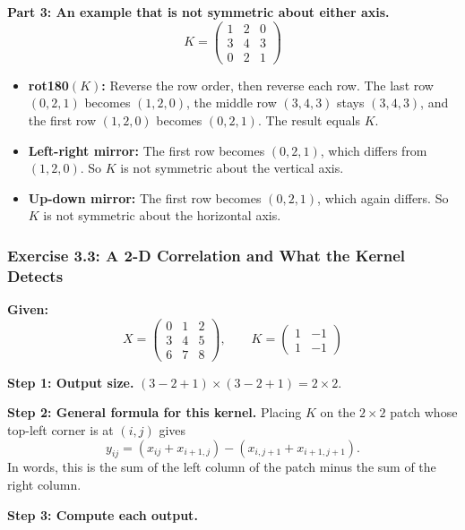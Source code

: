 \textbf{Part 3: An example that is not symmetric about either axis.}
\[
K = \begin{pmatrix} 1 & 2 & 0 \\ 3 & 4 & 3 \\ 0 & 2 & 1 \end{pmatrix}
\]
\begin{itemize}
  \item \textbf{rot180$(K)$:} Reverse the row order, then reverse each row. The last row $(0,2,1)$ becomes $(1,2,0)$, the middle row $(3,4,3)$ stays $(3,4,3)$, and the first row $(1,2,0)$ becomes $(0,2,1)$. The result equals $K$.
  \item \textbf{Left-right mirror:} The first row becomes $(0,2,1)$, which differs from $(1,2,0)$. So $K$ is not symmetric about the vertical axis.
  \item \textbf{Up-down mirror:} The first row becomes $(0,2,1)$, which again differs. So $K$ is not symmetric about the horizontal axis.
\end{itemize}

\subsubsection*{Exercise 3.3: A 2-D Correlation and What the Kernel Detects}

\textbf{Given:}
\[
X = \begin{pmatrix} 0 & 1 & 2 \\ 3 & 4 & 5 \\ 6 & 7 & 8 \end{pmatrix}, \qquad
K = \begin{pmatrix} 1 & -1 \\ 1 & -1 \end{pmatrix}
\]

\textbf{Step 1: Output size.}
$(3 - 2 + 1) \times (3 - 2 + 1) = 2 \times 2$.

\textbf{Step 2: General formula for this kernel.}
Placing $K$ on the $2\times 2$ patch whose top-left corner is at $(i, j)$ gives
\[
y_{ij} = (x_{ij} + x_{i+1,j}) - (x_{i,j+1} + x_{i+1,j+1}).
\]
In words, this is the sum of the left column of the patch minus the sum of the right column.

\textbf{Step 3: Compute each output.}

